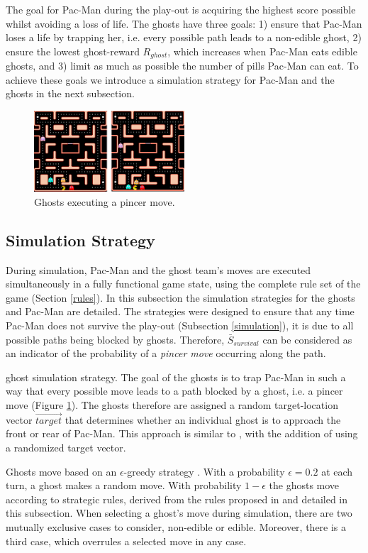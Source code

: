\documentclass[journal]{IEEEtran}
\begin{document}
The goal for Pac-Man during the play-out is acquiring the highest score possible whilst avoiding a loss of life. The ghosts have three goals: 1) ensure that Pac-Man loses a life by trapping her, i.e. every possible path leads to a non-edible ghost, 2) ensure the lowest ghost-reward $R_{ghost}$, which increases when Pac-Man eats edible ghosts, and 3) limit as much as possible the number of pills Pac-Man can eat. To achieve these goals we introduce a simulation strategy for Pac-Man and the ghosts in the next subsection.
\begin{figure}[ht]
	\centering
	\includegraphics[width=0.5\textwidth]{figure4.png}
	\caption{Ghosts executing a pincer move.}
	\label{fig:pincer}
\end{figure}

\subsection{Simulation Strategy}
\label{simstrat}
During simulation, Pac-Man and the ghost team's moves are executed simultaneously in a fully functional game state, using the complete rule set of the game (Section \ref{rules}). In this subsection the simulation strategies for the ghosts and Pac-Man are detailed. The strategies were designed to ensure that any time Pac-Man does not survive the play-out (Subsection \ref{simulation}), it is due to all possible paths being blocked by ghosts. Therefore, $\bar{S}_{survival}$ can be considered as an indicator of the probability of a \emph{pincer move} occurring along the path.

{\sc ghost simulation strategy}.
The goal of the ghosts is to trap Pac-Man in such a way that every possible move leads to a path blocked by a ghost, i.e. a pincer move (Figure \ref{fig:pincer}). The ghosts therefore are assigned a random target-location vector $\vec{target}$ that determines whether an individual ghost is to approach the front or rear of Pac-Man. This approach is similar to \cite{ikehata2011monte}, with the addition of using a randomized target vector.

Ghosts move based on an $\epsilon$-greedy strategy \cite{sutton1998reinforcement, sturtevant2008analysis}. With a probability $\epsilon = 0.2$ at each turn, a ghost makes a random move. With probability $1-\epsilon$ the ghosts move according to strategic rules, derived from the rules proposed in \cite{ikehata2011monte} and detailed in this subsection.
When selecting a ghost's move during simulation, there are two mutually exclusive cases to consider, non-edible or edible. Moreover, there is a third case, which overrules a selected move in any case.
\end{document}
